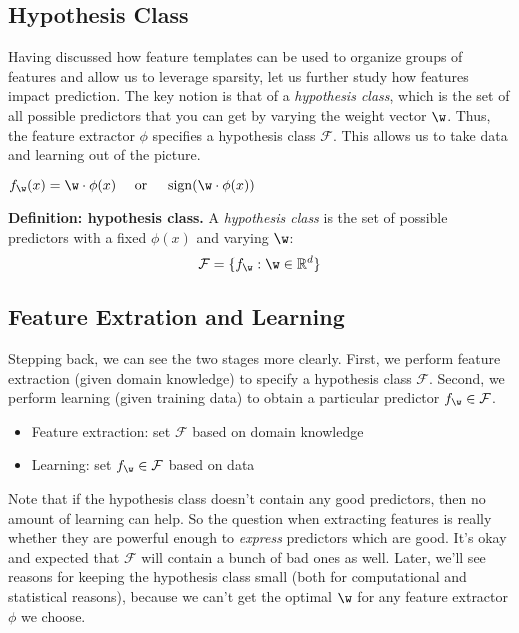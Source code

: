 
\subsection{Hypothesis Class} %
\label{sub:hypothesis_class}
Having discussed how feature templates can be used to organize groups of features and allow us to leverage sparsity,
let us further study how features impact prediction.
% 
The key notion is that of a \textit{hypothesis class},
which is the set of all possible predictors that you can get by varying the weight vector $\w$.
Thus, the feature extractor $\phi$ specifies a hypothesis class $\mathcal{F}$.
This allows us to take data and learning out of the picture.

 $f_{\w}(x) = \w \cdot \phi(x) \quad\text{ or }\quad \operatorname{sign}(\w \cdot \phi(x))$


\begin{example}
	\textbf{Definition: hypothesis class.} A \textit{hypothesis class} is the set of possible predictors with a fixed $\phi(x)$ and varying $\w$:
	\[
		\mathcal{F} = \{ f_{\w}: \w \in \mathbb{R}^d \}
	\]
\end{example}





\subsection{Feature Extration and Learning} %
\label{sub:feature_extration_and_learning}

Stepping back, we can see the two stages more clearly.
First, we perform feature extraction (given domain knowledge) to specify a hypothesis class $\mathcal{F}$.
Second, we perform learning (given training data) to obtain a particular predictor $f_{\w} \in \mathcal{F}$.
% 
\begin{itemize}
	\item Feature extraction: set $\mathcal{F}$ based on domain knowledge
	\item Learning: set $f_{\w} \in \mathcal{F}$ based on data
\end{itemize}
% 
Note that if the hypothesis class doesn't contain any good predictors, then no amount of learning can help.
So the question when extracting features is really whether they are powerful enough to \textit{express} predictors which are good.
It's okay and expected that $\mathcal{F}$ will contain a bunch of bad ones as well.
% 
Later, we'll see reasons for keeping the hypothesis class small (both for computational and statistical reasons),
because we can't get the optimal $\w$ for any feature extractor $\phi$ we choose.



